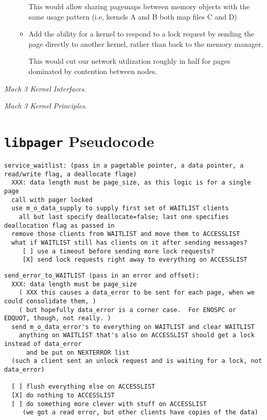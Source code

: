 \documentclass{article}
\def\libpager{{\tt libpager}\xspace}
\begin{document}
\begin{itemize}
\begin{itemize}
  This would allow sharing pagemaps between memory objects with the same usage pattern
  (i.e, kernels A and B both map files C and D)

\item Add the ability for a kernel to respond to a lock request by
  sending the page directly to another kernel, rather than back to the
  memory manager.

  This would cut our network utilization roughly in half for pages
  dominated by contention between nodes.

\end{itemize}

\end{itemize}

\begin{thebibliography}{9}

 {\it Mach 3 Kernel Interfaces}.

 {\it Mach 3 Kernel Principles}.

\end{thebibliography}

\appendix

\section{\libpager Pseudocode}

\small

\begin{verbatim}
service_waitlist: (pass in a pagetable pointer, a data pointer, a read/write flag, a deallocate flage)
  XXX: data length must be page_size, as this logic is for a single page
  call with pager locked
  use m_o_data_supply to supply first set of WAITLIST clients
    all but last specify deallocate=false; last one specifies deallocation flag as passed in
  remove those clients from WAITLIST and move them to ACCESSLIST
  what if WAITLIST still has clients on it after sending messages?
     [ ] use a timeout before sending more lock requests?
     [X] send lock requests right away to everything on ACCESSLIST
\end{verbatim}

\begin{verbatim}
send_error_to_WAITLIST (pass in an error and offset):
  XXX: data length must be page_size
    ( XXX this causes a data_error to be sent for each page, when we could consolidate them, )
    ( but hopefully data_error is a corner case.  For ENOSPC or EDQUOT, though, not really. )
  send m_o_data_error's to everything on WAITLIST and clear WAITLIST
    anything on WAITLIST that's also on ACCESSLIST should get a lock instead of data_error
      and be put on NEXTERROR list
  (such a client sent an unlock request and is waiting for a lock, not data_error)

  [ ] flush everything else on ACCESSLIST
  [X] do nothing to ACCESSLIST
  [ ] do something more clever with stuff on ACCESSLIST
     (we got a read error, but other clients have copies of the data)
\end{verbatim}
\end{document}
